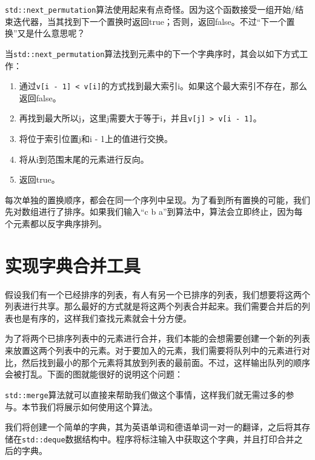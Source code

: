 
\texttt{std::next\_permutation}算法使用起来有点奇怪。因为这个函数接受一组开始/结束迭代器，当其找到下一个置换时返回true；否则，返回false。不过“下一个置换”又是什么意思呢？

当\texttt{std::next\_permutation}算法找到元素中的下一个字典序时，其会以如下方式工作：

\begin{enumerate}
\item 通过\texttt{v[i - 1] < v[i]}的方式找到最大索引i。如果这个最大索引不存在，那么返回false。

\item 再找到最大所以j，这里j需要大于等于i，并且\texttt{v[j] > v[i - 1]}。

\item 将位于索引位置j和i - 1上的值进行交换。

\item 将从i到范围末尾的元素进行反向。

\item 返回true。

\end{enumerate}

每次单独的置换顺序，都会在同一个序列中呈现。为了看到所有置换的可能，我们先对数组进行了排序。如果我们输入“c b a”到算法中，算法会立即终止，因为每个元素都以反字典序排列。


\section{实现字典合并工具}

假设我们有一个已经排序的列表，有人有另一个已排序的列表，我们想要将这两个列表进行共享。那么最好的方式就是将这两个列表合并起来。我们需要合并后的列表也是有序的，这样我们查找元素就会十分方便。

为了将两个已排序列表中的元素进行合并，我们本能的会想需要创建一个新的列表来放置这两个列表中的元素。对于要加入的元素，我们需要将队列中的元素进行对比，然后找到最小的那个元素将其放到列表的最前面。不过，这样输出队列的顺序会被打乱。下面的图就能很好的说明这个问题：


\texttt{std::merge}算法就可以直接来帮助我们做这个事情，这样我们就无需过多的参与。本节我们将展示如何使用这个算法。


我们将创建一个简单的字典，其为英语单词和德语单词一对一的翻译，之后将其存储在\texttt{std::deque}数据结构中。程序将标注输入中获取这个字典，并且打印合并之后的字典。

